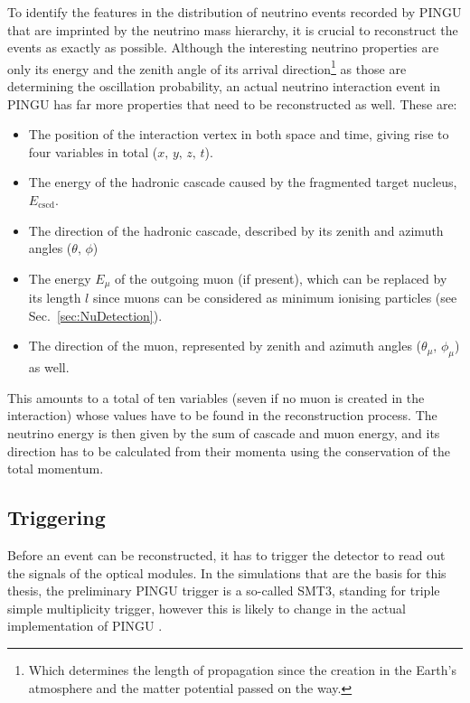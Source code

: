 To identify the features in the distribution of neutrino events recorded by
PINGU that are imprinted by the neutrino mass hierarchy, it is crucial to
reconstruct the events as exactly as possible. Although the interesting neutrino
properties are only its energy and the zenith angle of its arrival
direction\footnote{Which determines the length of propagation since the
creation in the Earth's atmosphere and the matter potential passed on the way.}
as those are determining the oscillation probability, an actual neutrino
interaction event in PINGU has far more properties that need to be
reconstructed as well. These are:
\begin{itemize}
 \item The position of the interaction vertex in both space and time, giving
  rise to four variables in total ($x,\,y,\,z,\,t$).
 \item The energy of the hadronic cascade caused by the fragmented target
  nucleus, $E_\mathrm{cscd}$.
 \item The direction of the hadronic cascade, described by its zenith and
  azimuth angles ($\theta,\,\phi$)
 \item The energy $E_\mu$ of the outgoing muon (if present), which can be
  replaced by its length $l$ since muons can be
  considered as minimum ionising particles (see Sec.~\ref{sec:NuDetection}).
 \item The direction of the muon, represented by zenith and azimuth angles
  ($\theta_\mu,\,\phi_\mu$) as well.
\end{itemize}
This amounts to a total of ten variables (seven if no muon is created in the
interaction) whose values have to be found in the reconstruction process. The
neutrino energy is then given by the sum of cascade and muon energy, and its
direction has to be calculated from their momenta using the conservation of the
total momentum. 

\subsection{Triggering}
\label{sec:reco_trigger}

Before an event can be reconstructed, it has to trigger the detector to read out
the signals of the optical modules. In the simulations that are the basis for
this thesis, the preliminary PINGU trigger is a so-called SMT3, standing for
triple simple multiplicity trigger, however this is likely to change in the
actual implementation of PINGU \cite{Trigger}.

